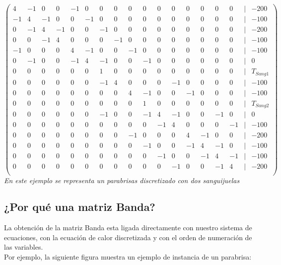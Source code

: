 \[ \left( \begin{matrix}
4 & -1 & 0 & 0 & -1 & 0 & 0 & 0 & 0 & 0 & 0 & 0 & 0 & 0 & 0 & 0 & | &-200\\
-1 & 4 & -1 & 0 & 0 & -1 & 0 & 0 & 0 & 0 & 0 & 0 & 0 & 0 & 0 & 0 & | &-100\\
0 & -1 & 4 & -1 & 0 & 0 & -1 & 0 & 0 & 0 & 0 & 0 & 0 & 0 & 0 & 0 & | &-200\\
0 & 0 & -1 & 4 & 0 & 0 & 0 & -1 & 0 & 0 & 0 & 0 & 0 & 0 & 0 & 0 & | &-100\\
-1 & 0 & 0 & 0 & 4 & -1 & 0 & 0 & -1 & 0 & 0 & 0 & 0 & 0 & 0 & 0 & | &-100\\
0 & -1 & 0 & 0 & -1 & 4 & -1 & 0 & 0 & -1 & 0 & 0 & 0 & 0 & 0 & 0 & | & 0\\
0 & 0 & 0 & 0 & 0 & 0 & 1 & 0 & 0 & 0 & 0 & 0 & 0 & 0 & 0 & 0 & | & T_{Sang1}\\
0 & 0 & 0 & 0 & 0 & 0 & -1 & 4 & 0 & 0 & 0 & -1 & 0 & 0 & 0 & 0 & | &-100\\
0 & 0 & 0 & 0 & 0 & 0 & 0 & 0 & 4 & -1 & 0 & 0 & -1 & 0 & 0 & 0 & | &-100\\
0 & 0 & 0 & 0 & 0 & 0 & 0 & 0 & 0 & 1 & 0 & 0 & 0 & 0 & 0 & 0 & | &T_{Sang2}\\
0 & 0 & 0 & 0 & 0 & 0 & -1 & 0 & 0 & -1 & 4 & -1 & 0 & 0 & -1 & 0 & | &0\\
0 & 0 & 0 & 0 & 0 & 0 & 0 & 0 & 0 & 0 & -1 & 4 & 0 & 0 & 0 & -1 & | &-100\\
0 & 0 & 0 & 0 & 0 & 0 & 0 & 0 & -1 & 0 & 0 & 0 & 4 & -1 & 0 & 0 & | &-200\\
0 & 0 & 0 & 0 & 0 & 0 & 0 & 0 & 0 & -1 & 0 & 0 & -1 & 4 & -1 & 0 & | &-100\\
0 & 0 & 0 & 0 & 0 & 0 & 0 & 0 & 0 & 0 & -1 & 0 & 0 & -1 & 4 & -1 & | &-100\\
0 & 0 & 0 & 0 & 0 & 0 & 0 & 0 & 0 & 0 & 0 & -1 & 0 & 0 & -1 & 4 & | &-200\\

\end{matrix} \right)\] 
\textit{En este ejemplo se representa un parabrisas discretizado con dos sanguijuelas}


\subsection{¿Por qué una matriz Banda?}
La obtención de la matriz Banda esta ligada directamente con nuestro sistema de ecuaciones, con la ecuación de calor discretizada y con el orden de numeración de las variables. \\
Por ejemplo, la siguiente figura  muestra un ejemplo de instancia de un parabrisa:

